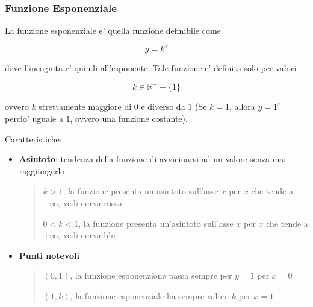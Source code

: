 \documentclass{article}
\begin{document}
{{    \pagebreak

    \subsubsection{Funzione Esponenziale}
    La funzione esponenziale e' quella funzione definibile come

    $$ y = k^x $$

    dove l'incognita e' quindi all'esponente. Tale funzione e' definita solo per valori 
    
    $$ k \in \mathbb{R}^+ - \{1\} $$

    ovvero $ k $ strettamente maggiore di $ 0 $ e diverso da $ 1 $ \small{(Se $ k = 1 $, allora $ y = 1^x $ percio' uguale a $ 1 $, ovvero una funzione costante)}.

  }

  Caratteristiche:
  \begin{itemize}
    \item \textbf{Asintoto}: tendenza della funzione di avvicinarsi ad un valore senza mai raggiungerlo
    \begin{quote}
      $ k > 1 $, la funzione presenta un asintoto sull'asse $ x $ per $ x $ che tende a $ -\infty $, vedi curva rossa

      $ 0 < k < 1 $, la funzione presenta un'asintoto sull'asse $ x $ per $ x $ che tende a $ +\infty $, vedi curva blu
    \end{quote}
    \item \textbf{Punti notevoli}
    \begin{quote}
      $ (0,1) $, la funzione esponenzione passa sempre per $ y = 1 $ per $ x = 0 $

      $ (1,k) $, la funzione esponenziale ha sempre valore $ k $ per $ x = 1 $
    \end{quote}
  \end{itemize}

}
\end{document}
